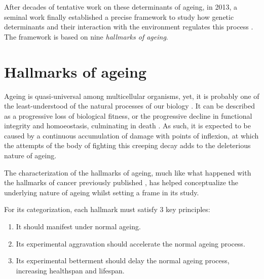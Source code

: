 After decades of tentative work on these determinants of ageing, in 2013, a seminal work finally established a precise framework to study how genetic determinants and their interaction with the environment regulates this process \cite{Lopez-Otin2013}. 
The framework is based on nine \emph{hallmarks of ageing}.

\section{Hallmarks of ageing} \label{s_intro_hallmarks}

Ageing is quasi-universal among multicellular organisms, yet, it is probably one of the least-understood of the natural processes of our biology \cite{Kirkwood2005}.
It can be described as a progressive loss of biological fitness, or the progressive decline in functional integrity and homoeostasis, culminating in death \cite{Singh2019}.
As such, it is expected to be caused by a continuous accumulation of damage with points of inflexion, at which the attempts of the body of fighting this creeping decay adds to the deleterious nature of ageing.

The characterization of the hallmarks of ageing, much like what happened with the hallmarks of cancer previously published \cite{Hanahan2011}, has helped conceptualize the underlying nature of ageing whilst setting a frame in its study.

For its categorization, each hallmark must satisfy 3 key principles:

\begin{enumerate}[topsep=1ex,itemsep=-1ex]
    \item It should manifest under normal ageing.
    \item Its experimental aggravation should accelerate the normal ageing process.
    \item Its experimental betterment should delay the normal ageing process, increasing healthspan and lifespan.
\end{enumerate}

